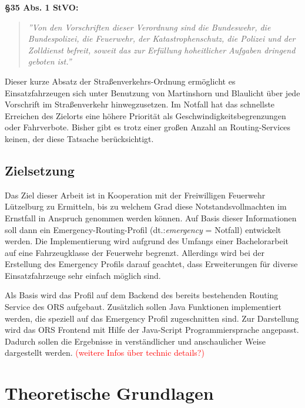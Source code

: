 \documentclass[12pt,a4paper]{article}
\newcommand\todo[1]{\textcolor{red}{#1}}
\begin{document}
\textbf{§35 Abs. 1 StVO:}
\begin{quotation}
{\itshape\rmfamily ''Von den Vorschriften dieser Verordnung sind die Bundeswehr, die Bundespolizei, die Feuerwehr, der Katastrophenschutz, die Polizei und der Zolldienst befreit, soweit das zur Erfüllung hoheitlicher Aufgaben dringend geboten ist.''}
\end{quotation}

\vspace{1.2cm}

Dieser kurze Absatz der Straßenverkehrs-Ordnung ermöglicht es Einsatzfahrzeugen sich unter Benutzung von Martinshorn und Blaulicht über jede Vorschrift im Straßenverkehr hinwegzusetzen. Im Notfall hat das schnellste Erreichen des Zielorts eine höhere Priorität als Geschwindigkeitsbegrenzungen oder Fahrverbote. Bisher gibt es trotz einer großen Anzahl an Routing-Services keinen, der diese Tatsache berücksichtigt. 


\subsection{Zielsetzung}
Das Ziel dieser Arbeit ist in Kooperation mit der Freiwilligen Feuerwehr Lützelburg zu Ermitteln, bis zu welchem Grad diese Notstandsvollmachten im Ernstfall in Anspruch genommen werden können. Auf Basis dieser Informationen soll dann ein Emergency-Routing-Profil (dt.:\textit{emergency} = Notfall) entwickelt werden. Die Implementierung wird aufgrund des Umfangs einer Bachelorarbeit auf eine Fahrzeugklasse der Feuerwehr begrenzt. Allerdings wird bei der Erstellung des Emergency Profils darauf geachtet, dass Erweiterungen für diverse Einsatzfahrzeuge sehr einfach möglich sind.
\vspace{0.5cm}
\begin{flushleft}


Als Basis wird das Profil auf dem Backend des bereits bestehenden Routing Service des ORS aufgebaut. Zusätzlich sollen Java Funktionen implementiert werden, die speziell auf das Emergency Profil zugeschnitten sind. Zur Darstellung wird das ORS Frontend mit Hilfe der Java-Script Programmiersprache angepasst. Dadurch sollen die Ergebnisse in verständlicher und anschaulicher Weise dargestellt werden. 
\todo{(weitere Infos über technic details?)}

\end{flushleft}
\newpage
\section{Theoretische Grundlagen}
\end{document}
